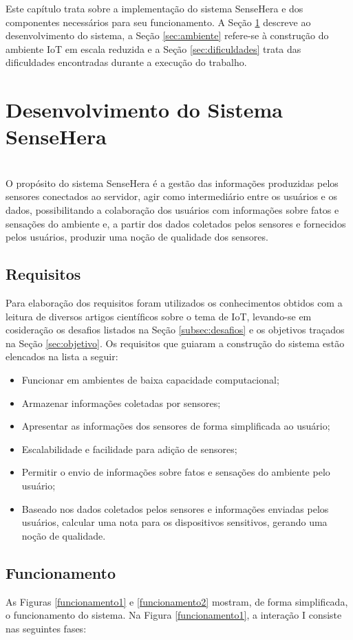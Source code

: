 
\quad Este capítulo trata sobre a implementação do sistema SenseHera e dos componentes necessários para seu funcionamento. A Seção \ref{sec:construcao} descreve ao desenvolvimento do sistema, a Seção \ref{sec:ambiente} refere-se à construção do ambiente \acrshort{IoT} em escala reduzida e a Seção \ref{sec:dificuldades} trata das dificuldades encontradas durante a execução do trabalho.
\section{Desenvolvimento do Sistema SenseHera}
\label{sec:construcao}
\\\null \quad O propósito do sistema SenseHera é a gestão das informações produzidas pelos sensores conectados ao servidor, agir como intermediário entre os usuários e os dados, possibilitando a colaboração dos usuários com informações sobre fatos e sensações do ambiente e, a partir dos dados coletados pelos sensores e fornecidos pelos usuários, produzir uma noção de qualidade dos sensores.

\subsection{Requisitos}
\null \quad Para elaboração dos requisitos foram utilizados os conhecimentos obtidos com a leitura de diversos artigos científicos sobre o tema de \acrlong{IoT}, levando-se em cosideração os desafios listados na Seção \ref{subsec:desafios} e os objetivos traçados na Seção \ref{sec:objetivo}. Os requisitos que guiaram a construção do sistema estão elencados na lista a seguir:
\begin{itemize}
  \item Funcionar em ambientes de baixa capacidade computacional;
  \item Armazenar informações coletadas por sensores;
  \item Apresentar as informações dos sensores de forma simplificada ao usuário;
  \item Escalabilidade e facilidade para adição de sensores;
  \item Permitir o envio de informações sobre fatos e sensações do ambiente pelo usuário;
  \item Baseado nos dados coletados pelos sensores e informações enviadas pelos usuários, calcular uma nota para os dispositivos sensitivos, gerando uma noção de qualidade.
\end{itemize}

\subsection{Funcionamento}
\null \quad As Figuras \ref{funcionamento1} e \ref{funcionamento2} mostram, de forma simplificada, o funcionamento do sistema. Na Figura \ref{funcionamento1}, a interação I consiste nas seguintes fases:

